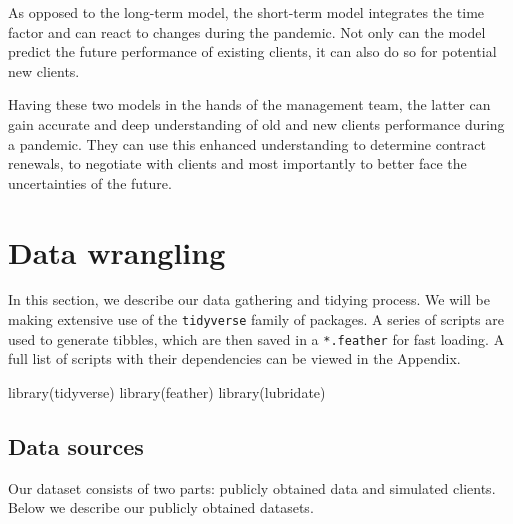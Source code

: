 \documentclass[
]{article}
\newenvironment{Shaded}{\begin{snugshade}}{\end{snugshade}}
\newcommand{\FunctionTok}[1]{\textcolor[rgb]{0.00,0.00,0.00}{#1}}
\newcommand{\NormalTok}[1]{#1}
\begin{document}
As opposed to the long-term model, the short-term model integrates the
time factor and can react to changes during the pandemic. Not only can
the model predict the future performance of existing clients, it can
also do so for potential new clients.

Having these two models in the hands of the management team, the latter
can gain accurate and deep understanding of old and new clients
performance during a pandemic. They can use this enhanced understanding
to determine contract renewals, to negotiate with clients and most
importantly to better face the uncertainties of the future.

\hypertarget{data-wrangling}{%
\section{Data wrangling}\label{data-wrangling}}

In this section, we describe our data gathering and tidying process. We
will be making extensive use of the \texttt{tidyverse} family of
packages. A series of scripts are used to generate tibbles, which are
then saved in a \texttt{*.feather} for fast loading. A full list of
scripts with their dependencies can be viewed in the Appendix.

\begin{Shaded}
\begin{Highlighting}[]
\FunctionTok{library}\NormalTok{(tidyverse)}
\FunctionTok{library}\NormalTok{(feather)}
\FunctionTok{library}\NormalTok{(lubridate)}
\end{Highlighting}
\end{Shaded}

\hypertarget{data-sources}{%
\subsection{Data sources}\label{data-sources}}

Our dataset consists of two parts: publicly obtained data and simulated
clients. Below we describe our publicly obtained datasets.
\end{document}

